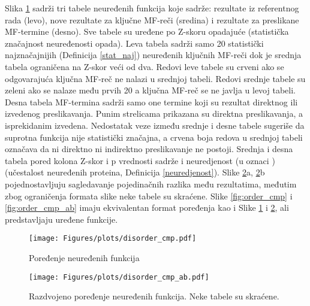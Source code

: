 Slika \ref{fig:disorder_cmp} sadrži tri tabele neuređenih funkcija koje sadrže:
rezultate iz referentnog rada (levo), nove rezultate za ključne MF-reči 
(sredina) i rezultate za preslikane MF-termine (desno). Sve tabele su uređene
po Z-skoru opadajuće (statistička značajnost neuređenosti opada).  Leva tabela
sadrži samo 20 statistički najznačajnijih (Definicija \ref{stat_naj})
neuređenih ključnih MF-reči  dok je srednja tabela ograničena na Z-skor veći od
dva.  Redovi leve tabele su crveni ako se odgovarajuća ključna MF-reč ne nalazi u
srednjoj tabeli.  Redovi srednje tabele su zeleni ako se nalaze među prvih 20 a
ključna MF-reč se ne javlja u levoj tabeli.  Desna tabela MF-termina sadrži samo
one termine koji su rezultat direktnog ili izvedenog preslikavanja.  Punim
strelicama prikazana su direktna preslikavanja, a isprekidanim izvedena.
Nedostatak veze između srednje i desne tabele sugeriše da suprotna funkcija
nije statistički značajna, a crvena boja redova u srednjoj tabeli označava da
ni direktno ni indirektno preslikavanje ne postoji.  Srednja i desna tabela
pored kolona Z-skor i p vrednosti sadrže i neuredjenost (u oznaci )
(učestalost neuređenih proteina, Definicija \ref{neuredjenost}).  Slike
\ref{fig:disorder_cmp_ab}a, \ref{fig:disorder_cmp_ab}b pojednostavljuju
sagledavanje pojedinačnih razlika među rezultatima, međutim zbog ograničenja
formata slike neke tabele su skraćene.  Slike \ref{fig:order_cmp} i
\ref{fig:order_cmp_ab}  imaju ekvivalentan format poređenja kao i Slike
\ref{fig:disorder_cmp} i \ref{fig:disorder_cmp_ab}, ali predstavljaju uređene
funkcije.



\clearpage

\begin{figure}[th]
\hspace*{-0.5cm} 
  \centering
\texttt{[image: Figures/plots/disorder\_cmp.pdf]}
\caption {
  Poređenje neuređenih funkcija
}
\label{fig:disorder_cmp}
\end{figure}

\clearpage

\begin{figure}[th]
  \centering
\texttt{[image: Figures/plots/disorder\_cmp\_ab.pdf]}
\caption {
  Razdvojeno poređenje neuređenih funkcija. Neke tabele su skraćene.
}
\label{fig:disorder_cmp_ab}
\end{figure}


